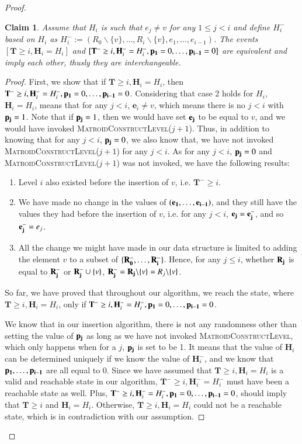 \documentclass[11pt]{article}
\newtheorem{claim}{Claim}[section]
\newcommand{\MatroidConstLevel}{\textsc{MatroidConstructLevel}}
\newcommand{\bE}{\ensuremath{\mathbf{e}}}
\newcommand{\bT}{\ensuremath{\mathbf{T}}}
\newcommand{\bH}{\ensuremath{\mathbf{H}}}
\begin{document}
\begin{proof}
\begin{claim}
\label{insertclaim}
Assume that $H_i$ is such that $e_j \neq v$ for any $1 \le j < i$ and define $H_i^-$ based on $H_i$ as $ H_i^- := 
    (R_0 \backslash \{v\} , \dots, R_i \backslash \{v\}, e_1, \dots, e_{i-1})$.
The events $[\bT \geq i, \bH_i = H_i]$ and $[\bT^- \geq i, \bH_i^- = H_i^-, \bold{p_1} = 0, \dots, \bold{p_{i - 1}} = 0]$ are equivalent 
and imply each other, thusly they are interchangeable.   
\end{claim}
\begin{proof}
First, we show that if $\bT \geq i, \bH_i = H_i$, then $\bT^- \geq i, \bH_i^- = H_i^-, \bold{p_1} = 0, \dots, \bold{p_{i - 1}} = 0$. 
Considering that case 2 holds for $H_i$, $\bH_i = H_i$, means that for any $j < i$, $\bE_i \neq v$, which means there is no $j < i$ with $\bold{p_j} = 1$. Note that if $\bold{p_j} = 1$, then we would have set $\bold{e_j}$ to be equal to $v$, and we would have invoked \MatroidConstLevel($j + 1$). Thus, in addition to knowing that for any $j < i$, $\bold{p_j} = 0$, we also know that, we have not invoked \MatroidConstLevel($j + 1$) for any $j < i$. As for any $j < i$, $\bold{p_j} = 0$ and \MatroidConstLevel($j + 1$) was not invoked, we have the following results: 
\begin{enumerate}
    \item 
    Level $i$ also existed before the insertion of $v$, i.e. $\bT^- \geq i$.
    \item 
    We have made no change in the values of $(\bold{e_1}, \dots, \bold{e_{i - 1}})$, and they still have the values they had before the insertion of $v$, i.e. for any  $j < i$, $\bold{e_j} = \bold{e_j^-}$, and so $\bold{e_j^-} = e_j$. 
    \item
    All the change we might have made in our data structure is limited to adding the element $v$ to a subset of $\{\bold{R_0^-}, \dots, \bold{R_i^-}\}$. Hence, for any $j \leq i$, whether $\bold{R_j}$ is equal to $\bold{R_j^-}$ or $\bold{R_j^-} \cup \{v\}$, $\bold{R_j^-} = \bold{R_j} \backslash \{v\} = R_j \backslash \{v\}$. 
\end{enumerate}
So far, we have proved that throughout our algorithm, we reach the state, where $\bT \geq i, \bH_i = H_i$, only if $\bT^- \geq i, \bH_i^- = H_i^-, \bold{p_1} = 0, \dots, \bold{p_{i - 1}} = 0$.

We know that in our insertion algorithm, there is not any randomness other than setting the value of $\bold{p_j}$ as long as we have not invoked \MatroidConstLevel, which only happens when for a $j$, $\bold{p_j}$ is set to be 1. It means that the value of $\bH_i$ can be determined uniquely if we know the value of $\bH_i^-$, and we know that $\bold{p_1}, \dots, \bold{p_{i - 1}}$ are all equal to $0$. 
Since we have assumed that $\bT \geq i, \bH_i = H_i$ is a valid and reachable state in our algorithm, $\bT^- \geq i, \bH_i^- = H_i^-$ must have been a reachable state as well. Plus, $\bT^- \geq i, \bH_i^- = H_i^-, \bold{p_1} = 0, \dots, \bold{p_{i - 1}} = 0$, should imply that $\bT \geq i$ and $ \bH_i = H_i$. Otherwise, $\bT \geq i, \bH_i = H_i$ could not be a reachable state, which is in contradiction with our assumption. 
\end{proof}


\end{proof}
\end{document}
